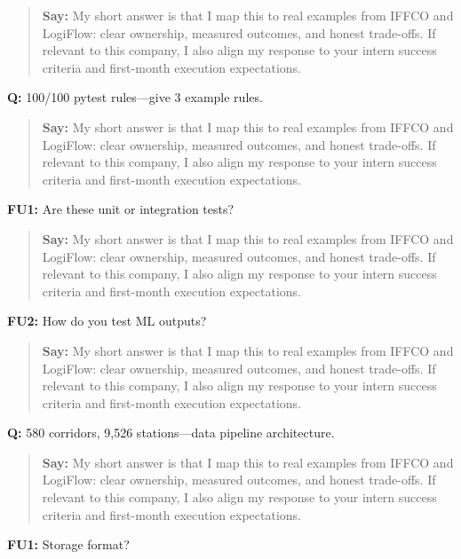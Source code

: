 \documentclass[9pt,a4paper]{article}
\begin{document}
\begin{quote}\small\textbf{Say:} My short answer is that I map this to real examples from IFFCO and LogiFlow: clear ownership, measured outcomes, and honest trade-offs. If relevant to this company, I also align my response to your intern success criteria and first-month execution expectations.\end{quote}
\vspace{2mm}
\textbf{Q:} 100/100 pytest rules---give 3 example rules.

\begin{quote}\small\textbf{Say:} My short answer is that I map this to real examples from IFFCO and LogiFlow: clear ownership, measured outcomes, and honest trade-offs. If relevant to this company, I also align my response to your intern success criteria and first-month execution expectations.\end{quote}
\vspace{2mm}
\textbf{FU1:} Are these unit or integration tests?

\begin{quote}\small\textbf{Say:} My short answer is that I map this to real examples from IFFCO and LogiFlow: clear ownership, measured outcomes, and honest trade-offs. If relevant to this company, I also align my response to your intern success criteria and first-month execution expectations.\end{quote}
\vspace{2mm}
\textbf{FU2:} How do you test ML outputs?

\begin{quote}\small\textbf{Say:} My short answer is that I map this to real examples from IFFCO and LogiFlow: clear ownership, measured outcomes, and honest trade-offs. If relevant to this company, I also align my response to your intern success criteria and first-month execution expectations.\end{quote}
\vspace{2mm}
\textbf{Q:} 580 corridors, 9,526 stations---data pipeline architecture.

\begin{quote}\small\textbf{Say:} My short answer is that I map this to real examples from IFFCO and LogiFlow: clear ownership, measured outcomes, and honest trade-offs. If relevant to this company, I also align my response to your intern success criteria and first-month execution expectations.\end{quote}
\vspace{2mm}
\textbf{FU1:} Storage format?
\end{document}
